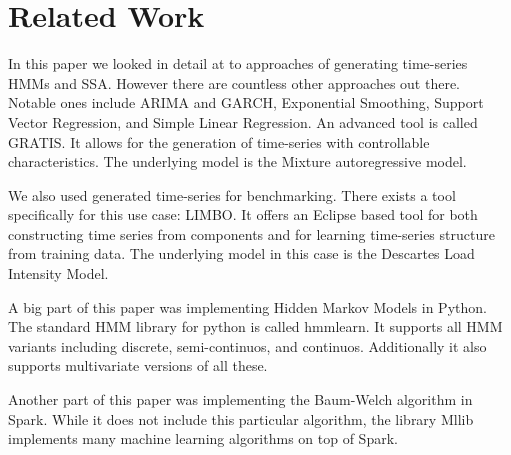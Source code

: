\chapter{Related Work}\label{chapter:related}

In this paper we looked in detail at to approaches of generating time-series HMMs and SSA. However there are countless other approaches out there. Notable ones include ARIMA and GARCH, Exponential Smoothing, Support Vector Regression, and Simple Linear Regression.\parencite{inproceedings} An advanced tool is called GRATIS. It allows for the generation of time-series with controllable characteristics. The underlying model is the Mixture autoregressive model. \parencite{kang2019gratis}

We also used generated time-series for benchmarking. There exists a tool specifically for this use case: LIMBO. It offers an Eclipse based tool for both constructing time series from components and for learning time-series structure from training data. The underlying model in this case is the Descartes Load Intensity Model. \parencite{v2014limbo}

A big part of this paper was implementing Hidden Markov Models in Python. The standard HMM library for python is called hmmlearn. \parencite{weiss2019hmmlearn} It supports all HMM variants including discrete, semi-continuos, and continuos. Additionally it also supports multivariate versions of all these. 

Another part of this paper was implementing the Baum-Welch algorithm in Spark. While it does not include this particular algorithm, the library Mllib implements many machine learning algorithms on top of Spark. \parencite{meng2016mllib}